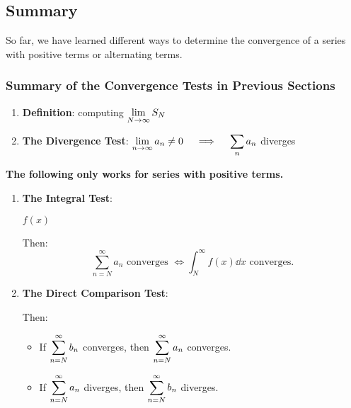 \newpage
\subsection{Summary} 
So far, we have learned different ways to determine the convergence of a series with positive terms or alternating terms.

\subsubsection{Summary of the Convergence Tests in Previous Sections}

\begin{center}
\begin{tcolorbox}
\begin{enumerate}
    \item \textbf{Definition}: computing $\displaystyle\lim_{N \to \infty} S_N$
    
    \item \textbf{The Divergence Test}: $\displaystyle\lim_{n \to \infty} a_n \neq 0 \quad \implies \quad \sum_n a_n$ diverges
\end{enumerate}

\textbf{The following only works for series with positive terms.}
\begin{enumerate}[resume]
    \item \textbf{The Integral Test}: 
    
    $f(x)$  Then:
    \[\sum_{n=N}^\infty a_n \text{ converges } \iff \int_N^\infty f(x) \dd x \text{ converges.}\]
    
    \item \textbf{The Direct Comparison Test}: 
    Then:
    \begin{itemize}
        \item If $\displaystyle\sum_{n=N}^\infty b_n$ converges, then $\displaystyle\sum_{n=N}^\infty a_n$ converges.
        \item If $\displaystyle\sum_{n=N}^\infty a_n$ diverges, then $\displaystyle\sum_{n=N}^\infty b_n$ diverges.
    \end{itemize}
    

\end{enumerate}
\end{tcolorbox}
\end{center}
